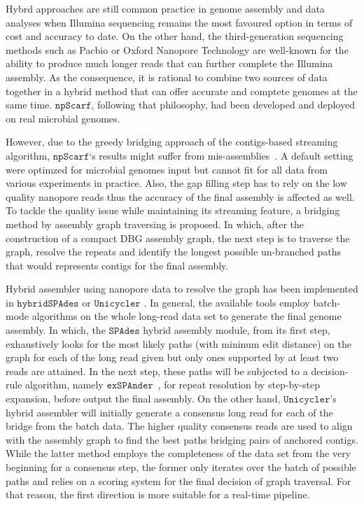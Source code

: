 \documentclass[10pt,twocolumn,twoside]{genpaper}
\newcommand{\npscarf}{$\mathtt{npScarf}$}
\newcommand{\unicycler}{$\mathtt{Unicycler}$}
\newcommand{\spades}{$\mathtt{SPAdes}$}
\begin{document}
Hybrd approaches are still common practice in genome assembly and data analyses when Illumina sequencing remains the most favoured option in terms of cost and accuracy to date.
On the other hand, the third-generation sequencing methods such as Pacbio or Oxford Nanopore Technology are well-known for the ability to produce much longer reads that can further complete the Illumina assembly.
As the consequence, it is rational to combine two sources of data together in a hybrid method that can offer accurate and comptete genomes at the same time.
\npscarf{}, following that philosophy, had been developed and deployed on real microbial genomes.

However, due to the greedy bridging approach of the contigs-based streaming algorithm, \npscarf{}`s results might suffer from mis-assemblies~\cite{Wick2017unicycler,Giordano2017}. 
A default setting were optimzed for microbial genomes input but cannot fit for all data from various experiments in practice.
Also, the gap filling step has to rely on the low quality nanopore reads thus the accuracy of the final assembly is affected as well. 
To tackle the quality issue while maintaining its streaming feature, a bridging method by assembly graph traversing is proposed. 
In which, after the construction of a compact DBG assembly graph, the next step is to traverse the graph, resolve the repeats and identify the longest possible un-branched paths that would represents contigs for the final assembly.

Hybrid assembler using nanopore data to resolve the graph has been implemented in $\mathtt{hybridSPAdes}$ \cite{AntipovKM2015} or \unicycler{} \cite{Wick2017unicycler}. 
In general, the available tools employ batch-mode algorithms on the whole long-read data set to generate the final genome assembly. 
In which, the \spades{} hybrid assembly module, from its first step, exhaustively looks for the most likely paths (with mininum edit distance) on the graph for each of the long read given but only ones supported by at least two reads are attained. In the next step, these paths will be subjected to a decision-rule algorithm, namely $\mathtt{exSPAnder}$~\cite{Prjibelski2014}, for repeat resolution by step-by-step expansion, before output the final assembly.
On the other hand, \unicycler{}'s hybrid assembler will initially generate a consensus long read for each of the bridge from the batch data. 
The higher quality consensus reads are used to align with the assembly graph to find the best paths bridging pairs of anchored contigs.
While the latter method employs the completeness of the data  set from the very beginning for a consensus step, the former only iterates over the batch of possible paths and relies on a scoring system for the final decision of graph traversal. For that reason, the first direction is more suitable for a real-time pipeline.
    
\end{document}
